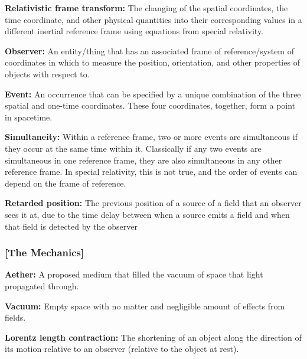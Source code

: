 \noindent \hypertarget{def-lorentz-transform}{\textbf{Relativistic frame transform:}}
The changing of the spatial coordinates, the time coordinate, and other physical quantities into their corresponding values in a different inertial reference frame using equations from special relativity.

\noindent \hypertarget{def-observer}{\textbf{Observer:}}
An entity/thing that has an associated frame of reference/system of coordinates in which to measure the position, orientation, and other properties of objects with respect to.

\noindent \hypertarget{def-event}{\textbf{Event:}}
An occurrence that can be specified by a unique combination of the three spatial and one-time coordinates. These four coordinates, together, form a point in spacetime.

\noindent \hypertarget{def-simultaneity}{\textbf{Simultaneity:}}
Within a reference frame, two or more events are simultaneous if they occur at the same time within it. Classically if any two events are simultaneous in one reference frame, they are also simultaneous in any other reference frame. In special relativity, this is not true, and the order of events can depend on the frame of reference.

\noindent \hypertarget{def-retarded-position}{\textbf{Retarded position:}}
The previous position of a source of a field that an observer sees it at, due to the time delay between when a source emits a field and when that field is detected by the observer


\subsubsection{[The Mechanics]}%

\noindent \hypertarget{def-aether}{\textbf{Aether:}}
A proposed medium that filled the vacuum of space that light propagated through.

\noindent \hypertarget{def-vacuum}{\textbf{Vacuum:}}
Empty space with no matter and negligible amount of effects from fields.

\noindent \hypertarget{def-length-contraction}{\textbf{Lorentz length contraction:}}
The shortening of an object along the direction of its motion relative to an observer (relative to the object at rest).

